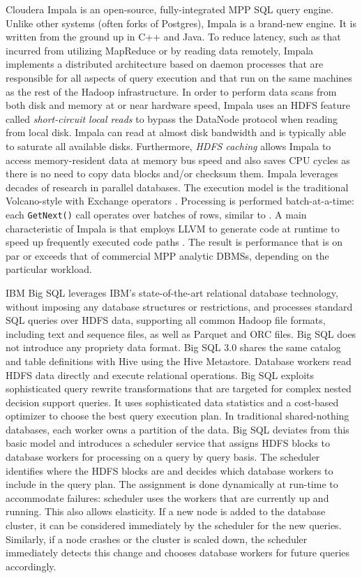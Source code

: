 \documentclass{vldb}
\begin{document}
Cloudera Impala \cite{Kornacker+15} is an open-source, fully-integrated MPP SQL query engine. Unlike other systems (often forks of Postgres), Impala is a brand-new engine. It is written from the ground up in C++ and Java. To reduce latency, such as that incurred from utilizing MapReduce or by reading data remotely, Impala implements a distributed architecture based on daemon processes that are responsible for all aspects of query execution and that run on the same machines as the rest of the Hadoop infrastructure. 
In order to perform data scans from both disk and memory at or near hardware speed,
Impala uses an HDFS feature called {\em short-circuit local reads} \cite{hdfs:shortcircuit} to bypass the DataNode protocol when reading from local disk. Impala can read at almost disk bandwidth and is typically able to saturate all available disks. Furthermore, {\em HDFS caching} \cite{hdfs:caching} allows Impala to access memory-resident data at memory bus speed and also saves CPU cycles as there is no need to copy data blocks and/or checksum them.
Impala leverages decades of research in parallel databases. The execution model is the traditional
Volcano-style with Exchange operators \cite{Graefe90}. Processing is performed batch-at-a-time:
each \texttt{GetNext()} call operates over batches of rows, similar to
\cite{PadmanabhanMAJ01}. A main characteristic of Impala is that employs LLVM to generate code at runtime to speed up frequently executed code paths \cite{WandermanL14}. The result is performance that is on par or exceeds that of commercial MPP analytic DBMSs, depending on the particular workload.

IBM Big SQL \cite{bigsql} leverages IBM's state-of-the-art relational database technology, without imposing any database structures or restrictions, and processes standard SQL queries over HDFS data, supporting all common Hadoop file formats, including text and sequence files, as well as Parquet and ORC files. Big SQL does not introduce any propriety data format. Big SQL 3.0 shares the same catalog and table definitions with Hive using the Hive Metastore. Database workers read HDFS data directly and execute relational operations. Big SQL exploits sophisticated query rewrite transformations \cite{pirahesh96, winmagic} that are targeted for complex nested decision support queries. It uses sophisticated data statistics and a cost-based optimizer to choose the best query execution plan. In traditional shared-nothing databases, each worker owns a partition of the data. Big SQL deviates from this basic model and introduces a scheduler service that assigns HDFS blocks to database workers for processing on a query by query basis. The scheduler identifies where the HDFS blocks are and decides which database workers to include in the query plan. The assignment is done dynamically at run-time to accommodate failures: scheduler uses the workers that are currently up and running. This also allows elasticity. If a new node is added to the database cluster, it can be considered immediately by the scheduler for the new queries. Similarly, if a node crashes or the cluster is scaled down, the scheduler immediately detects this change and chooses database workers for future queries accordingly.
\end{document}
